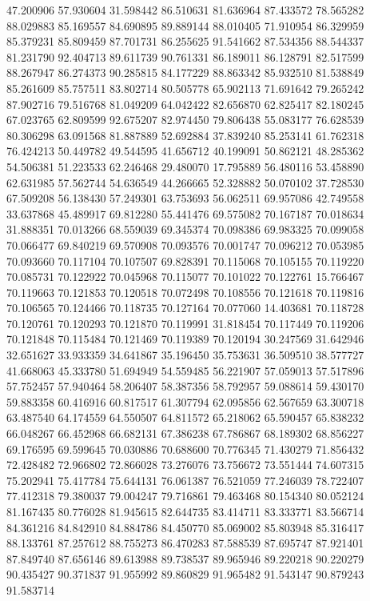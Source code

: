 47.200906
57.930604
31.598442
86.510631
81.636964
87.433572
78.565282
88.029883
85.169557
84.690895
89.889144
88.010405
71.910954
86.329959
85.379231
85.809459
87.701731
86.255625
91.541662
87.534356
88.544337
81.231790
92.404713
89.611739
90.761331
86.189011
86.128791
82.517599
88.267947
86.274373
90.285815
84.177229
88.863342
85.932510
81.538849
85.261609
85.757511
83.802714
80.505778
65.902113
71.691642
79.265242
87.902716
79.516768
81.049209
64.042422
82.656870
62.825417
82.180245
67.023765
62.809599
92.675207
82.974450
79.806438
55.083177
76.628539
80.306298
63.091568
81.887889
52.692884
37.839240
85.253141
61.762318
76.424213
50.449782
49.544595
41.656712
40.199091
50.862121
48.285362
54.506381
51.223533
62.246468
29.480070
17.795889
56.480116
53.458890
62.631985
57.562744
54.636549
44.266665
52.328882
50.070102
37.728530
67.509208
56.138430
57.249301
63.753693
56.062511
69.957086
42.749558
33.637868
45.489917
69.812280
55.441476
69.575082
70.167187
70.018634
31.888351
70.013266
68.559039
69.345374
70.098386
69.983325
70.099058
70.066477
69.840219
69.570908
70.093576
70.001747
70.096212
70.053985
70.093660
70.117104
70.107507
69.828391
70.115068
70.105155
70.119220
70.085731
70.122922
70.045968
70.115077
70.101022
70.122761
15.766467
70.119663
70.121853
70.120518
70.072498
70.108556
70.121618
70.119816
70.106565
70.124466
70.118735
70.127164
70.077060
14.403681
70.118728
70.120761
70.120293
70.121870
70.119991
31.818454
70.117449
70.119206
70.121848
70.115484
70.121469
70.119389
70.120194
30.247569
31.642946
32.651627
33.933359
34.641867
35.196450
35.753631
36.509510
38.577727
41.668063
45.333780
51.694949
54.559485
56.221907
57.059013
57.517896
57.752457
57.940464
58.206407
58.387356
58.792957
59.088614
59.430170
59.883358
60.416916
60.817517
61.307794
62.095856
62.567659
63.300718
63.487540
64.174559
64.550507
64.811572
65.218062
65.590457
65.838232
66.048267
66.452968
66.682131
67.386238
67.786867
68.189302
68.856227
69.176595
69.599645
70.030886
70.688600
70.776345
71.430279
71.856432
72.428482
72.966802
72.866028
73.276076
73.756672
73.551444
74.607315
75.202941
75.417784
75.644131
76.061387
76.521059
77.246039
78.722407
77.412318
79.380037
79.004247
79.716861
79.463468
80.154340
80.052124
81.167435
80.776028
81.945615
82.644735
83.414711
83.333771
83.566714
84.361216
84.842910
84.884786
84.450770
85.069002
85.803948
85.316417
88.133761
87.257612
88.755273
86.470283
87.588539
87.695747
87.921401
87.849740
87.656146
89.613988
89.738537
89.965946
89.220218
90.220279
90.435427
90.371837
91.955992
89.860829
91.965482
91.543147
90.879243
91.583714
